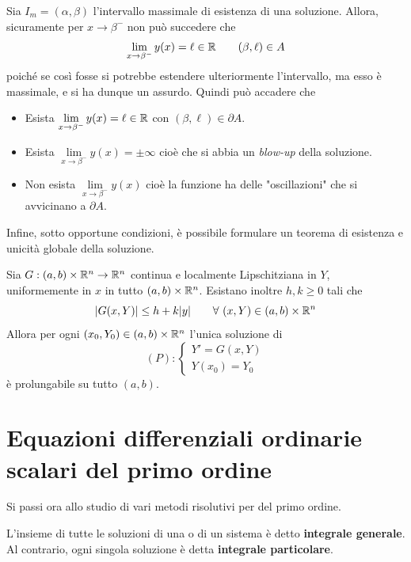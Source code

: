 \begin{oss}
    Sia $I_m=(\alpha, \beta)$ l'intervallo massimale di esistenza di una soluzione. Allora, sicuramente per $x \to \beta^-$ non può succedere che 
        \begin{equation*}
            \lim_{x \to \beta^-}{y(x)}= \ell \in \mathbb{R} \qquad (\beta, \ell) \in A
        \end{equation*}
        poiché se così fosse si potrebbe estendere ulteriormente l'intervallo, ma esso è massimale, e si ha dunque un assurdo.
        Quindi può accadere che
        \begin{itemize}
            \item Esista $\lim\limits_{x \to \beta^-}{y(x)}= \ell \in \mathbb{R}$
            con $(\beta, \ell) \in \partial A$.
            \item Esista $\lim\limits_{x \to \beta^-}{y(x)}= \pm \infty$
            cioè che si abbia un \textit{blow-up} della soluzione.
            \item Non esista $\lim\limits_{x \to \beta^-}{y(x)}$
                cioè la funzione ha delle "oscillazioni" che si avvicinano a $\partial A$.
            \end{itemize}
\end{oss}
Infine, sotto opportune condizioni, è possibile formulare un teorema di esistenza e unicità globale della soluzione.
\begin{theorem} \label{Teo: Esistenza e unicità globale}
    Sia $G: (a, b) \times \mathbb{R}^n \to \mathbb{R}^n$ continua e localmente Lipschitziana in $Y$, uniformemente in $x$ in tutto $(a, b) \times \mathbb{R}^n$. Esistano inoltre $h,k \geq 0$ tali che 
    \begin{equation} \label{Eq: Crescità sublineare}
        \left|G(x, Y)\right| \leq h+ k|y|
    \qquad \forall\ (x, Y) \in (a,b) \times \mathbb{R}^n
    \end{equation}
    Allora per ogni $(x_0, Y_0) \in (a,b) \times \mathbb{R}^n$ l'unica soluzione di 
    \begin{equation*}
        (P): \begin{cases}
       Y'=G(x, Y)\\
       Y(x_0)=Y_0
       \end{cases}
    \end{equation*}
    è prolungabile su tutto $(a, b)$.
\end{theorem}
\section{Equazioni differenziali ordinarie scalari del primo ordine}
Si passi ora allo studio di vari metodi risolutivi per \odes del primo ordine. 
\begin{definition}
    L'insieme di tutte le soluzioni di una \ode o di un sistema è detto \textbf{integrale generale}. Al contrario, ogni singola soluzione è detta \textbf{integrale particolare}.
\end{definition}
